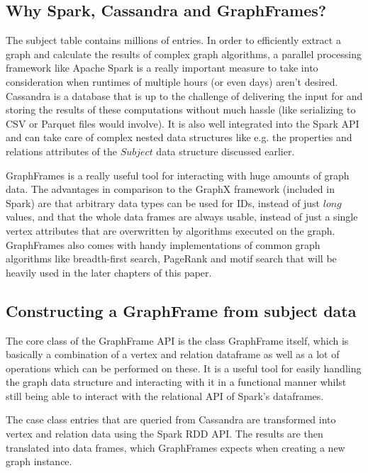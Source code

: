 \documentclass[
        a4paper,     %
        titlepage,   %
        oneside,     %
        parskip      %
        ]{scrartcl}  %
\begin{document}
    \subsection{Why Spark, Cassandra and GraphFrames?}
    The subject table contains millions of entries. In order to efficiently extract
    a graph and calculate the results of complex graph algorithms, a parallel processing
    framework like Apache Spark is a really important measure to take into consideration when runtimes
    of multiple hours (or even days) aren't desired. Cassandra is a database that
    is up to the challenge of delivering the input for and storing the results of
    these computations without much hassle (like serializing to CSV or Parquet files would involve).
    It is also well integrated into the Spark API and can take care of complex nested
    data structures like e.g. the properties and relations attributes of the $Subject$
    data structure discussed earlier.

    GraphFrames is a really useful tool for interacting with huge amounts of graph
    data. The advantages in comparison to the GraphX framework (included in Spark) are that arbitrary data types
    can be used for IDs, instead of just $long$ values, and that the whole data frames
    are always usable, instead of just a single vertex attributes that are overwritten
    by algorithms executed on the graph. GraphFrames also comes with handy implementations
    of common graph algorithms like breadth-first search, PageRank and motif search
    that will be heavily used in the later chapters of this paper.

    \subsection{Constructing a GraphFrame from subject data}
    The core class of the GraphFrame API is the class GraphFrame itself, which
    is basically a combination of a vertex and relation dataframe as well as a
    lot of operations which can be performed on these. It is a useful tool for
    easily handling the graph data structure and interacting with it in a functional
    manner whilst still being able to interact with the relational API of Spark's dataframes.

    The case class entries that are queried from Cassandra are transformed into vertex
    and relation data using the Spark RDD API. The results are then translated into
    data frames, which GraphFrames expects when creating a new graph instance.
\end{document}
